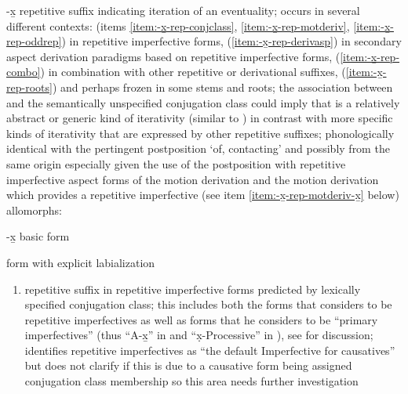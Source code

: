 \begin{morphdesc}[resume*=alphalist]
\item[-x̱]\label{m:-x̱}
	repetitive suffix indicating iteration of an eventuality;
	occurs in several different contexts:
		(items \ref{item:-x̱-rep-conjclass}, 
			\ref{item:-x̱-rep-motderiv},
			\ref{item:-x̱-rep-oddrep})
			in repetitive imperfective forms,
		(\ref{item:-x̱-rep-derivasp})
			in secondary aspect derivation paradigms
			based on  repetitive imperfective forms,
		(\ref{item:-x̱-rep-combo})
			in combination with other repetitive
			or derivational suffixes,
		(\ref{item:-x̱-rep-roots})
			and perhaps frozen in some stems and roots;
		the association between  and the semantically unspecified
			 conjugation class could imply that
			 is a relatively abstract or generic
			kind of iterativity (similar to )
			in contrast with more specific kinds of iterativity 
			that are expressed by other repetitive suffixes;
	phonologically identical with the pertingent postposition  ‘of, contacting’
		and possibly from the same origin especially
		given the use of the postposition 
		with repetitive imperfective aspect forms of the motion derivation
		and the motion derivation
		which provides a  repetitive imperfective
		(see item \ref{item:-x̱-rep-motderiv-x̱} below) 
	\newline
	allomorphs:
	\begin{allolist}
	\item[-x̱]	basic form
	\item[\X{-x̱w}]	form with explicit labialization
	\end{allolist}
	\begin{enumerate}
	\item	\label{item:-x̱-rep-conjclass}
		repetitive suffix in repetitive imperfective forms predicted
			by lexically specified  conjugation class;
		this includes both the forms that \citeauthor{leer:1991}
			considers to be repetitive imperfectives
			as well as forms that he considers to be “primary imperfectives”
			(thus “A-x̱” in \cite[iii]{leer:1978b}
			and “x̣-Processive” in \cite[245]{leer:1991}),
			see \cite[119]{crippen:2019} for discussion;
		\citeauthor{leer:1991} identifies  repetitive imperfectives as
			“the default Imperfective for causatives” \parencite[245]{leer:1991}
			but does not clarify if this is due to a causative
			form being assigned  conjugation class membership
			so this area needs further investigation

\end{enumerate}
\end{morphdesc}
